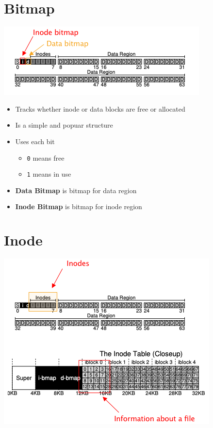 \documentclass[12pt]{article}
\begin{document}
\section*{Bitmap}

\begin{center}
\includegraphics[width=\linewidth]{images/midterm_1_solution_10.png}
\end{center}

\begin{itemize}
    \item Tracks whether inode or data blocks are free or allocated
    \item Is a simple and popuar structure
    \item Uses each bit
    \begin{itemize}
        \item \texttt{0} means free
        \item \texttt{1} means in use
    \end{itemize}

    \item \textbf{Data Bitmap} is bitmap for data region
    \item \textbf{Inode Bitmap} is bitmap for inode region
\end{itemize}

\section*{Inode}

\begin{center}
\includegraphics[width=\linewidth]{images/midterm_1_solution_12.png}
\end{center}
\end{document}
